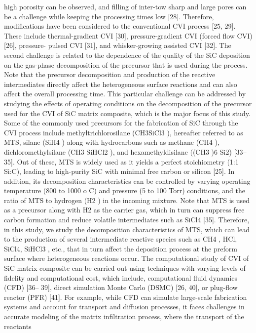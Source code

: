 \documentclass[final, letterpaper, square, comma, numbers, sort&compress]{elsarticle}
\begin{document}
high porosity can be observed, and filling of inter-tow sharp and large pores can be a challenge while keeping
the processing times low [28]. Therefore, modifications have been considered to the conventional CVI process
[25, 29]. These include thermal-gradient CVI [30], pressure-gradient CVI (forced flow CVI) [26], pressure-
pulsed CVI [31], and whisker-growing assisted CVI [32]. The second challenge is related to the dependence
of the quality of the SiC deposition on the gas-phase decomposition of the precursor that is used during the
process. Note that the precursor decomposition and production of the reactive intermediates directly affect
the heterogeneous surface reactions and can also affect the overall processing time. This particular challenge
can be addressed by studying the effects of operating conditions on the decomposition of the precursor used
for the CVI of SiC matrix composite, which is the major focus of this study.
Some of the commonly used precursors for the fabrication of SiC through the CVI process include
methyltrichlorosilane (CH3SiCl3 ), hereafter referred to as MTS, silane (SiH4 ) along with hydrocarbons such
as methane (CH4 ), dichloromethylsilane (CH3 SiHCl2 ), and hexamethyldisilane ((CH3 )6 Si2) [33–35]. Out
of these, MTS is widely used as it yields a perfect stoichiometry (1:1 Si:C), leading to high-purity SiC
with minimal free carbon or silicon [25]. In addition, its decomposition characteristics can be controlled by
varying operating temperature (800 to 1000 o C) and pressure (5 to 100 Torr) conditions, and the ratio of
MTS to hydrogen (H2 ) in the incoming mixture. Note that MTS is used as a precursor along with H2 as
the carrier gas, which in turn can suppress free carbon formation and reduce volatile intermediates such as
SiCl4 [35]. Therefore, in this study, we study the decomposition characteristics of MTS, which can lead to
the production of several intermediate reactive species such as CH4 , HCl, SiCl4, SiHCl3 , etc., that in turn
affect the deposition process at the preform surface where heterogeneous reactions occur.
The computational study of CVI of SiC matrix composite can be carried out using techniques with
varying levels of fidelity and computational cost, which include, computational fluid dynamics (CFD) [36–
39], direct simulation Monte Carlo (DSMC) [26, 40], or plug-flow reactor (PFR) [41]. For example, while
CFD can simulate large-scale fabrication systems and account for transport and diffusion processes, it faces
challenges in accurate modeling of the matrix infiltration process, where the transport of the reactants
\end{document}
